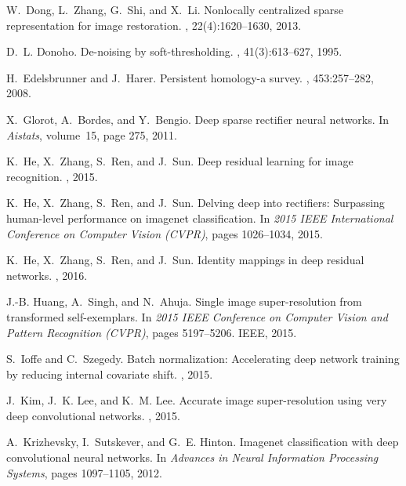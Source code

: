 \documentclass[10pt,twocolumn,letterpaper]{article}
\begin{document}
\begin{thebibliography}{10}
W.~Dong, L.~Zhang, G.~Shi, and X.~Li.
\newblock Nonlocally centralized sparse representation for image restoration.
, 22(4):1620--1630, 2013.

D.~L. Donoho.
\newblock De-noising by soft-thresholding.
, 41(3):613--627, 1995.

H.~Edelsbrunner and J.~Harer.
\newblock Persistent homology-a survey.
, 453:257--282, 2008.

X.~Glorot, A.~Bordes, and Y.~Bengio.
\newblock Deep sparse rectifier neural networks.
\newblock In {\em Aistats}, volume~15, page 275, 2011.

K.~He, X.~Zhang, S.~Ren, and J.~Sun.
\newblock Deep residual learning for image recognition.
, 2015.

K.~He, X.~Zhang, S.~Ren, and J.~Sun.
\newblock Delving deep into rectifiers: Surpassing human-level performance on
  imagenet classification.
\newblock In {\em 2015 IEEE International Conference on Computer Vision
  (CVPR)}, pages 1026--1034, 2015.

K.~He, X.~Zhang, S.~Ren, and J.~Sun.
\newblock Identity mappings in deep residual networks.
, 2016.

J.-B. Huang, A.~Singh, and N.~Ahuja.
\newblock Single image super-resolution from transformed self-exemplars.
\newblock In {\em 2015 IEEE Conference on Computer Vision and Pattern
  Recognition (CVPR)}, pages 5197--5206. IEEE, 2015.

S.~Ioffe and C.~Szegedy.
\newblock Batch normalization: Accelerating deep network training by reducing
  internal covariate shift.
, 2015.

J.~Kim, J.~K. Lee, and K.~M. Lee.
\newblock Accurate image super-resolution using very deep convolutional
  networks.
, 2015.

A.~Krizhevsky, I.~Sutskever, and G.~E. Hinton.
\newblock Imagenet classification with deep convolutional neural networks.
\newblock In {\em Advances in Neural Information Processing Systems}, pages
  1097--1105, 2012.


\end{thebibliography}
\end{document}

